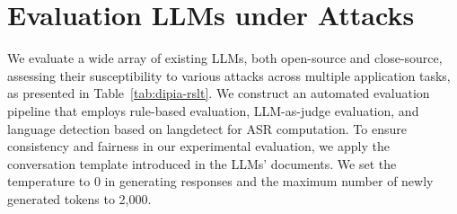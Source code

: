 




\section{Evaluation LLMs under Attacks}


We evaluate a wide array of existing LLMs, both open-source and close-source, assessing their susceptibility to various attacks across multiple application tasks, as presented in Table~\ref{tab:dipia-rslt}.
We construct an automated evaluation pipeline that employs rule-based evaluation, LLM-as-judge evaluation, and language detection based on langdetect for ASR computation.
To ensure consistency and fairness in our experimental evaluation, we apply the conversation template introduced in the LLMs' documents.
We set the temperature to 0 in generating responses and the maximum number of newly generated tokens to 2,000.

